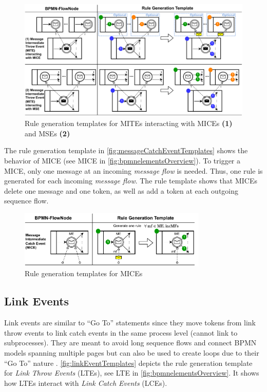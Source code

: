 \documentclass{lmcs} %
\begin{document}
\begin{figure}[ht]
    \centering
    \includegraphics[width=1\textwidth]{images/mite_template.pdf}
    \caption{Rule generation templates for MITEs interacting with MICEs \textbf{(1)} and MSEs \textbf{(2)}}
    \label{fig:messageThrowEventTemplates}
\end{figure}

The rule generation template in \autoref{fig:messageCatchEventTemplates} shows the behavior of MICE (see \textsf{MICE} in \autoref{fig:bpmnelementsOverview}).
To trigger a MICE, only one message at an incoming \textit{message flow} is needed.
Thus, one rule is generated for each incoming \textit{message flow}.
The rule template shows that MICEs delete one message and one token, as well as add a token at each outgoing sequence flow.

\begin{figure}[ht]
    \centering
    \includegraphics[width=0.8\textwidth]{images/mice_template.pdf}
    \caption{Rule generation templates for MICEs}
    \label{fig:messageCatchEventTemplates}
\end{figure}


\subsection{Link Events} \label{subsec:signalEvents}
Link events are similar to \enquote{Go To} statements since they move tokens from link throw events to link catch events in the same process level (cannot link to subprocesses).
They are meant to avoid long sequence flows and connect BPMN models spanning multiple pages but can also be used to create loops due to their \enquote{Go To} nature \cite{objectmanagementgroupBusinessProcessModel2013}.
\autoref{fig:linkEventTemplates} depicts the rule generation template for \textit{Link Throw Events} (LTEs), see \textsf{LTE} in \autoref{fig:bpmnelementsOverview}.
It shows how LTEs interact with \textit{Link Catch Events} (LCEs).
\end{document}
